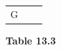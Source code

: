{{\begin{center}
\begin{tabular}[t]{|l|l|l|}
     \tabularnewline\cline{1-1}\cline{2-2}\cline{3-3}
    
    
        G &
    
    
         &
    
    
     \tabularnewline\cline{1-1}\cline{2-2}\cline{3-3}
    \end{tabular}
      \end{center}
    \begin{center}{\small\bfseries Table 13.3}\end{center}
    
    \addtocounter{footnote}{-0}
    
          }{ %
        
    
        \begin{center}
      
      \label{m39358*id70156}
      
    \noindent
      \tablelasttail{}
      \begin{xtabular}[t]{|l|l|l|}\hline
    

\end{xtabular}
\end{center}}}
